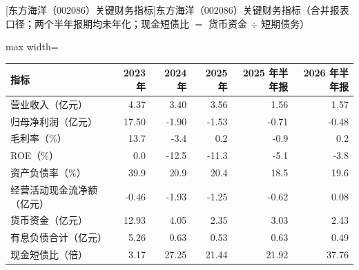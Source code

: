 \begin{center}\small\setlength{\tabcolsep}{3.4pt}
[东方海洋（002086）关键财务指标]{东方海洋（002086）关键财务指标（合并报表口径；两个半年报期均未年化；现金短债比 $=$ 货币资金 $\div$ 短期债务）}
\begin{adjustbox}{max width=\textwidth}
\begin{tabular}{@{}lrrrrr@{}}
\toprule
指标 & 2023 年 & 2024 年 & 2025 年 & 2025 年半年报 & 2026 年半年报 \\
\midrule
营业收入（亿元） & 4.37 & 3.40 & 3.56 & 1.56 & 1.57 \\
归母净利润（亿元） & 17.50 & -1.90 & -1.53 & -0.71 & -0.48 \\
毛利率（\%） & 13.7 & -3.4 & 0.2 & -0.9 & 0.2 \\
ROE（\%） & 0.0 & -12.5 & -11.3 & -5.1 & -3.8 \\
资产负债率（\%） & 39.9 & 20.9 & 20.4 & 18.5 & 19.6 \\
经营活动现金流净额（亿元） & -0.46 & -1.93 & -1.25 & -0.62 & 0.08 \\
货币资金（亿元） & 12.93 & 4.05 & 2.35 & 3.03 & 2.43 \\
有息负债合计（亿元） & 5.26 & 0.63 & 0.53 & 0.63 & 0.49 \\
现金短债比（倍） & 3.17 & 27.25 & 21.44 & 21.92 & 37.76 \\
\bottomrule
\end{tabular}
\end{adjustbox}
\end{center}

